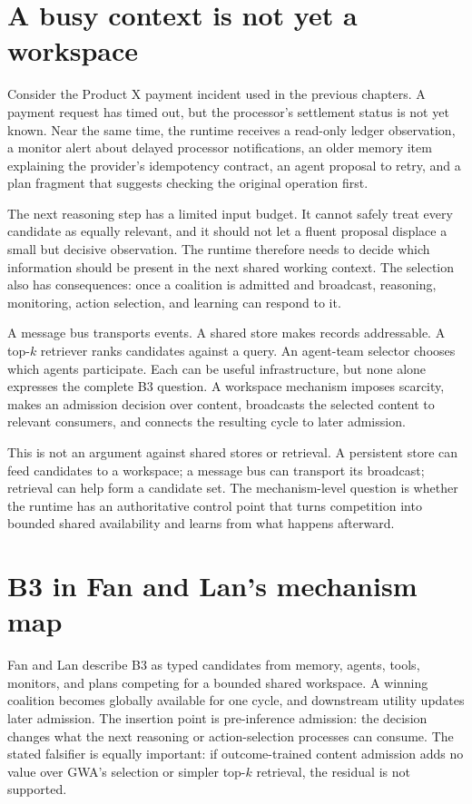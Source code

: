 \section{A busy context is not yet a workspace}
\label{sec:ch14-opening}

\BookExampleLabel{} Consider the Product X payment incident used in the previous chapters. A payment request has timed out, but the processor's settlement status is not yet known. Near the same time, the runtime receives a read-only ledger observation, a monitor alert about delayed processor notifications, an older memory item explaining the provider's idempotency contract, an agent proposal to retry, and a plan fragment that suggests checking the original operation first.

The next reasoning step has a limited input budget. It cannot safely treat every candidate as equally relevant, and it should not let a fluent proposal displace a small but decisive observation. The runtime therefore needs to decide which information should be present in the next shared working context. The selection also has consequences: once a coalition is admitted and broadcast, reasoning, monitoring, action selection, and learning can respond to it.

A message bus transports events. A shared store makes records addressable. A top-$k$ retriever ranks candidates against a query. An agent-team selector chooses which agents participate. Each can be useful infrastructure, but none alone expresses the complete B3 question. A workspace mechanism imposes scarcity, makes an admission decision over content, broadcasts the selected content to relevant consumers, and connects the resulting cycle to later admission.

This is not an argument against shared stores or retrieval. A persistent store can feed candidates to a workspace; a message bus can transport its broadcast; retrieval can help form a candidate set. The mechanism-level question is whether the runtime has an authoritative control point that turns competition into bounded shared availability and learns from what happens afterward.

\section{B3 in Fan and Lan's mechanism map}
\label{sec:ch14-b3-map}

Fan and Lan describe B3 as typed candidates from memory, agents, tools, monitors, and plans competing for a bounded shared workspace. A winning coalition becomes globally available for one cycle, and downstream utility updates later admission. The insertion point is pre-inference admission: the decision changes what the next reasoning or action-selection processes can consume. The stated falsifier is equally important: if outcome-trained content admission adds no value over GWA's selection or simpler top-$k$ retrieval, the residual is not supported.

